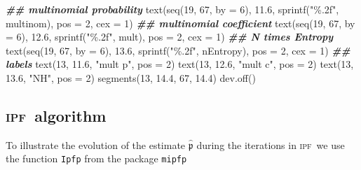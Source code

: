\documentclass[
]{article}
\newenvironment{Shaded}{\begin{snugshade}}{\end{snugshade}}
\newcommand{\AttributeTok}[1]{\textcolor[rgb]{0.77,0.63,0.00}{#1}}
\newcommand{\DecValTok}[1]{\textcolor[rgb]{0.00,0.00,0.81}{#1}}
\newcommand{\DocumentationTok}[1]{\textcolor[rgb]{0.56,0.35,0.01}{\textbf{\textit{#1}}}}
\newcommand{\FloatTok}[1]{\textcolor[rgb]{0.00,0.00,0.81}{#1}}
\newcommand{\FunctionTok}[1]{\textcolor[rgb]{0.00,0.00,0.00}{#1}}
\newcommand{\NormalTok}[1]{#1}
\newcommand{\StringTok}[1]{\textcolor[rgb]{0.31,0.60,0.02}{#1}}
\newcommand{\prob}[1]{\mathfrak{#1}}
\newcommand{\maxentP}{\hat{\prob p}}
\newcommand{\ipf}{\textsc{ipf}~}
\begin{document}
\begin{Shaded}
\begin{Highlighting}[]
\DocumentationTok{\#\# multinomial probability}
\FunctionTok{text}\NormalTok{(}\FunctionTok{seq}\NormalTok{(}\DecValTok{19}\NormalTok{, }\DecValTok{67}\NormalTok{, }\AttributeTok{by =} \DecValTok{6}\NormalTok{), }\FloatTok{11.6}\NormalTok{, }\FunctionTok{sprintf}\NormalTok{(}\StringTok{"\%.2f"}\NormalTok{, multinom), }\AttributeTok{pos =} \DecValTok{2}\NormalTok{, }\AttributeTok{cex =} \DecValTok{1}\NormalTok{)}
\DocumentationTok{\#\# multinomial coefficient}
\FunctionTok{text}\NormalTok{(}\FunctionTok{seq}\NormalTok{(}\DecValTok{19}\NormalTok{, }\DecValTok{67}\NormalTok{, }\AttributeTok{by =} \DecValTok{6}\NormalTok{), }\FloatTok{12.6}\NormalTok{, }\FunctionTok{sprintf}\NormalTok{(}\StringTok{"\%.2f"}\NormalTok{, mult), }\AttributeTok{pos =} \DecValTok{2}\NormalTok{, }\AttributeTok{cex =} \DecValTok{1}\NormalTok{)}
\DocumentationTok{\#\# N times Entropy}
\FunctionTok{text}\NormalTok{(}\FunctionTok{seq}\NormalTok{(}\DecValTok{19}\NormalTok{, }\DecValTok{67}\NormalTok{, }\AttributeTok{by =} \DecValTok{6}\NormalTok{), }\FloatTok{13.6}\NormalTok{, }\FunctionTok{sprintf}\NormalTok{(}\StringTok{"\%.2f"}\NormalTok{, nEntropy), }\AttributeTok{pos =} \DecValTok{2}\NormalTok{, }\AttributeTok{cex =} \DecValTok{1}\NormalTok{)}
\DocumentationTok{\#\# labels}
\FunctionTok{text}\NormalTok{(}\DecValTok{13}\NormalTok{, }\FloatTok{11.6}\NormalTok{, }\StringTok{"mult p"}\NormalTok{, }\AttributeTok{pos =} \DecValTok{2}\NormalTok{)}
\FunctionTok{text}\NormalTok{(}\DecValTok{13}\NormalTok{, }\FloatTok{12.6}\NormalTok{, }\StringTok{"mult c"}\NormalTok{, }\AttributeTok{pos =} \DecValTok{2}\NormalTok{)}
\FunctionTok{text}\NormalTok{(}\DecValTok{13}\NormalTok{, }\FloatTok{13.6}\NormalTok{, }\StringTok{"NH"}\NormalTok{, }\AttributeTok{pos =} \DecValTok{2}\NormalTok{)}
\FunctionTok{segments}\NormalTok{(}\DecValTok{13}\NormalTok{, }\FloatTok{14.4}\NormalTok{, }\DecValTok{67}\NormalTok{, }\FloatTok{14.4}\NormalTok{)}
\FunctionTok{dev.off}\NormalTok{()}
\end{Highlighting}
\end{Shaded}

\hypertarget{algorithm}{%
\subsection{\texorpdfstring{\ipf algorithm}{algorithm}}\label{algorithm}}

To illustrate the evolution of the estimate \(\maxentP\) during the
iterations in \ipf we use the function \texttt{Ipfp} from the package
\texttt{mipfp}
\end{document}
